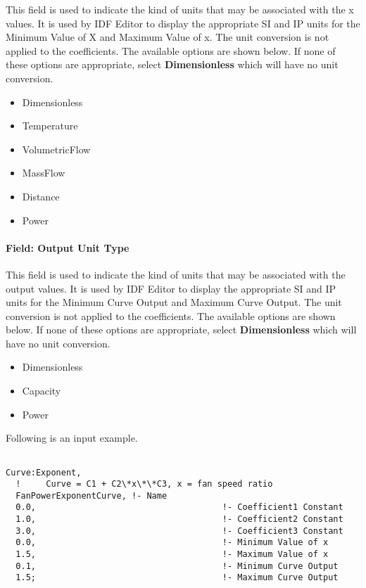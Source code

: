 This field is used to indicate the kind of units that may be associated with the x values. It is used by IDF Editor to display the appropriate SI and IP units for the Minimum Value of X and Maximum Value of x. The unit conversion is not applied to the coefficients. The available options are shown below. If none of these options are appropriate, select \textbf{Dimensionless} which will have no unit conversion.

\begin{itemize}
\item
  Dimensionless
\item
  Temperature
\item
  VolumetricFlow
\item
  MassFlow
\item
  Distance
\item
  Power
\end{itemize}

\paragraph{Field: Output Unit Type}\label{field-output-unit-type-4}

This field is used to indicate the kind of units that may be associated with the output values. It is used by IDF Editor to display the appropriate SI and IP units for the Minimum Curve Output and Maximum Curve Output. The unit conversion is not applied to the coefficients. The available options are shown below. If none of these options are appropriate, select \textbf{Dimensionless} which will have no unit conversion.

\begin{itemize}
\item
  Dimensionless
\item
  Capacity
\item
  Power
\end{itemize}

Following is an input example.

\begin{lstlisting}

Curve:Exponent,
  !     Curve = C1 + C2\*x\*\*C3, x = fan speed ratio
  FanPowerExponentCurve, !- Name
  0.0,                                     !- Coefficient1 Constant
  1.0,                                     !- Coefficient2 Constant
  3.0,                                     !- Coefficient3 Constant
  0.0,                                     !- Minimum Value of x
  1.5,                                     !- Maximum Value of x
  0.1,                                     !- Minimum Curve Output
  1.5;                                     !- Maximum Curve Output
\end{lstlisting}

